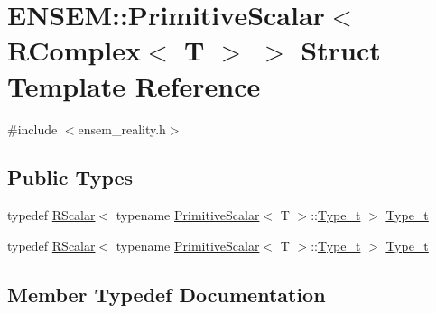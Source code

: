 \hypertarget{structENSEM_1_1PrimitiveScalar_3_01RComplex_3_01T_01_4_01_4}{}\section{E\+N\+S\+EM\+:\+:Primitive\+Scalar$<$ R\+Complex$<$ T $>$ $>$ Struct Template Reference}
\label{structENSEM_1_1PrimitiveScalar_3_01RComplex_3_01T_01_4_01_4}


{\ttfamily \#include $<$ensem\+\_\+reality.\+h$>$}

\subsection*{Public Types}
\begin{DoxyCompactItemize}
\item 
typedef \mbox{\hyperlink{classENSEM_1_1RScalar}{R\+Scalar}}$<$ typename \mbox{\hyperlink{structENSEM_1_1PrimitiveScalar}{Primitive\+Scalar}}$<$ T $>$\+::\mbox{\hyperlink{structENSEM_1_1PrimitiveScalar_3_01RComplex_3_01T_01_4_01_4_ad770c97f1555b5a3cd1a0f563d4ba782}{Type\+\_\+t}} $>$ \mbox{\hyperlink{structENSEM_1_1PrimitiveScalar_3_01RComplex_3_01T_01_4_01_4_ad770c97f1555b5a3cd1a0f563d4ba782}{Type\+\_\+t}}
\item 
typedef \mbox{\hyperlink{classENSEM_1_1RScalar}{R\+Scalar}}$<$ typename \mbox{\hyperlink{structENSEM_1_1PrimitiveScalar}{Primitive\+Scalar}}$<$ T $>$\+::\mbox{\hyperlink{structENSEM_1_1PrimitiveScalar_3_01RComplex_3_01T_01_4_01_4_ad770c97f1555b5a3cd1a0f563d4ba782}{Type\+\_\+t}} $>$ \mbox{\hyperlink{structENSEM_1_1PrimitiveScalar_3_01RComplex_3_01T_01_4_01_4_ad770c97f1555b5a3cd1a0f563d4ba782}{Type\+\_\+t}}
\end{DoxyCompactItemize}


\subsection{Member Typedef Documentation}
\mbox{\label{structENSEM_1_1PrimitiveScalar_3_01RComplex_3_01T_01_4_01_4_ad770c97f1555b5a3cd1a0f563d4ba782}} 
